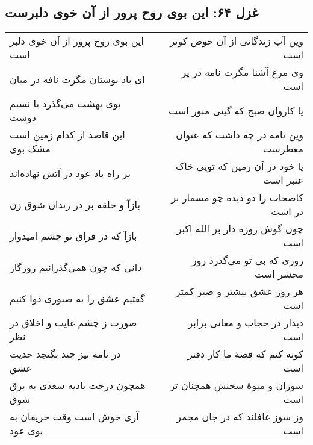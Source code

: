 \begin{center}
\section*{غزل ۶۴: این بوی روح پرور از آن خوی دلبرست}
\label{sec:064}
\begin{longtable}{l p{0.5cm} r}
این بوی روح پرور از آن خوی دلبر است
&&
وین آب زندگانی از آن حوض کوثر است
\\
ای باد بوستان مگرت نافه در میان
&&
وی مرغ آشنا مگرت نامه در پر است
\\
بوی بهشت می‌گذرد یا نسیم دوست
&&
یا کاروان صبح که گیتی منور است
\\
این قاصد از کدام زمین است مشک بوی
&&
وین نامه در چه داشت که عنوان معطرست
\\
بر راه باد عود در آتش نهاده‌اند
&&
یا خود در آن زمین که تویی خاک عنبر است
\\
بازآ و حلقه بر در رندان شوق زن
&&
کاصحاب را دو دیده چو مسمار بر در است
\\
بازآ که در فراق تو چشم امیدوار
&&
چون گوش روزه دار بر الله اکبر است
\\
دانی که چون همی‌گذرانیم روزگار
&&
روزی که بی تو می‌گذرد روز محشر است
\\
گفتیم عشق را به صبوری دوا کنیم
&&
هر روز عشق بیشتر و صبر کمتر است
\\
صورت ز چشم غایب و اخلاق در نظر
&&
دیدار در حجاب و معانی برابر است
\\
در نامه نیز چند بگنجد حدیث عشق
&&
کوته کنم که قصهٔ ما کار دفتر است
\\
همچون درخت بادیه سعدی به برق شوق
&&
سوزان و میوهٔ سخنش همچنان تر است
\\
آری خوش است وقت حریفان به بوی عود
&&
وز سوز غافلند که در جان مجمر است
\\
\end{longtable}
\end{center}
